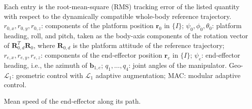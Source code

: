 \begin{table}[htbp]
\begin{threeparttable}
\begin{tablenotes}
\footnotesize
\item[] Each entry is the root-mean-square (RMS) tracking error of the listed quantity with respect to the dynamically compatible whole-body reference trajectory.
$r_{0,x}, r_{0,y}, r_{0,z}$: components of the platform position $\boldsymbol{r}_0$ in $\{I\}$;
$\psi_0, \phi_0, \theta_0$: platform heading, roll, and pitch, taken as the body-axis components of the rotation vector of $\boldsymbol{R}_{0,d}^T \boldsymbol{R}_0$, where $\boldsymbol{R}_{0,d}$ is the platform attitude of the reference trajectory;
$r_{e,x}, r_{e,y}, r_{e,z}$: components of the end-effector position $\boldsymbol{r}_e$ in $\{I\}$;
$\psi_e$: end-effector heading, i.e., the azimuth of $\boldsymbol{b}_{1,e}$;
$q_1, \dots, q_4$: joint angles of the manipulator.
Geo-$\mathcal{L}_1$: geometric control with $\mathcal{L}_1$ adaptive augmentation;
MAC: modular adaptive control.
\item[1] Mean speed of the end-effector along its path.
\end{tablenotes}
\end{threeparttable}
\end{table}
